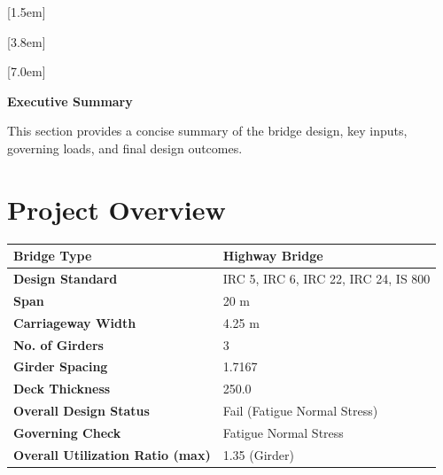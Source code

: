 \documentclass[12pt,a4paper]{report}
\numberwithin{table}{chapter}
\numberwithin{figure}{chapter}
\begin{document}
[1.5em]
  {\normalfont\vspace{2pt}}
  {\contentslabel{1.5em}}
  {\hspace*{-1.5em}}
  {\hfill\contentspage}

[3.8em]
  {\normalfont}
  {\contentslabel{2.3em}}
  {\hspace*{-2.3em}}
  {\hfill\contentspage}

[7.0em]
  {\normalfont}
  {\contentslabel{3.2em}}
  {\hspace*{-3.2em}}
  {\hfill\contentspage}

\newpage
\renewcommand{\contentsname}{\centering\Large\bfseries Table of Contents}
\tableofcontents


\newpage
{\centering\Large\bfseries Executive Summary\par}
\vspace{0.8em}

This section provides a concise summary of the bridge design, key inputs, governing loads, and final design outcomes.

\section*{Project Overview}
\label{sec:project-overview}


\begin{tabular}{|L{5.5cm}|L{8.5cm}|}
\hline
\textbf{Bridge Type} & Highway Bridge \\
\hline
\textbf{Design Standard} & IRC 5, IRC 6, IRC 22, IRC 24, IS 800 \\
\hline
\textbf{Span} & 20 m \\
\hline
\textbf{Carriageway Width} & 4.25 m \\
\hline
\textbf{No. of Girders} & 3 \\
\hline
\textbf{Girder Spacing} & 1.7167 \\
\hline
\textbf{Deck Thickness} & 250.0 \\
\hline
\textbf{Overall Design Status} & Fail (Fatigue Normal Stress) \\
\hline
\textbf{Governing Check} & Fatigue Normal Stress \\
\hline
\textbf{Overall Utilization Ratio (max)} & 1.35 (Girder) \\
\hline
\end{tabular}
\end{document}
